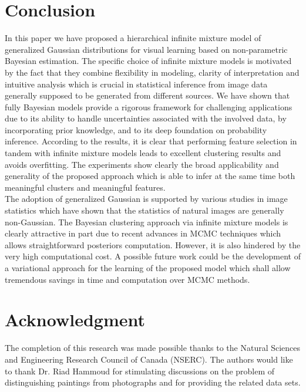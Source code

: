 \documentclass[journal,10pt]{elsart}
\begin{document}
\section{Conclusion}
In this paper we have proposed a hierarchical infinite mixture model of generalized Gaussian distributions for visual learning based on non-parametric Bayesian estimation. The specific choice of infinite mixture models is motivated by the fact that they combine flexibility in modeling, clarity of interpretation and intuitive analysis which is crucial in statistical inference from image data generally supposed to be generated from different sources.  We have shown that fully Bayesian models provide a rigorous framework for challenging applications due to its ability to handle uncertainties associated with the involved data, by incorporating prior knowledge, and to its deep foundation on probability inference. According to the results, it is clear that performing feature selection in tandem with infinite mixture models leads to excellent clustering results and avoids overfitting. The experiments show clearly the broad applicability and generality of the proposed approach which is able to infer at the same time both meaningful clusters and meaningful features.\\
The adoption of generalized Gaussian is supported by various studies in image statistics which have shown that the statistics of natural images are generally non-Gaussian. The Bayesian clustering approach via infinite mixture models is clearly attractive in part due to recent advances in MCMC techniques which allows straightforward posteriors computation. However, it is also hindered by the very high computational cost. A possible future work could be the development of a variational approach for the learning of the proposed model which shall allow tremendous savings in time and computation over MCMC methods.
\section*{Acknowledgment}
The completion of this research was made possible thanks to the
Natural Sciences and Engineering Research Council of Canada
(NSERC). The authors would like to thank Dr. Riad Hammoud for stimulating discussions on the problem of distinguishing paintings from photographs and for providing the related data sets.


\end{document}
